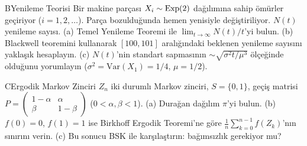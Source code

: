 \begin{alistirma}[Al.7.11]{B}{Yenileme Teorisi}
Bir makine parçası $X_i \sim \operatorname{Exp}(2)$ dağılımına sahip ömürler geçiriyor ($i = 1, 2, \ldots$).
Parça bozulduğunda hemen yenisiyle değiştiriliyor. $N(t)$ yenileme sayısı.
(a) Temel Yenileme Teoremi ile $\lim_{t\to\infty} N(t)/t$'yi bulun.
(b) Blackwell teoremini kullanarak $[100, 101]$ aralığındaki beklenen yenileme sayısını yaklaşık hesaplayın.
(c) $N(t)$'nin standart sapmasının $\sim \sqrt{\sigma^2 t/\mu^3}$ ölçeğinde olduğunu yorumlayın
    ($\sigma^2 = \mathrm{Var}(X_1) = 1/4$, $\mu = 1/2$).
\end{alistirma}

\begin{alistirma}[Al.7.12]{C}{Ergodik Markov Zinciri}
$Z_n$ iki durumlı Markov zinciri, $S = \{0, 1\}$, geçiş matrisi
$P = \begin{pmatrix}1-\alpha & \alpha \\ \beta & 1-\beta\end{pmatrix}$
($0 < \alpha, \beta < 1$).
(a) Durağan dağılım $\pi$'yi bulun.
(b) $f(0) = 0$, $f(1) = 1$ ise Birkhoff Ergodik Teoremi'ne göre
    $\frac{1}{n}\sum_{k=0}^{n-1} f(Z_k)$'nın sınırını verin.
(c) Bu sonucu BSK ile karşılaştırın: bağımsızlık gerekiyor mu?
\end{alistirma}

\endinput
